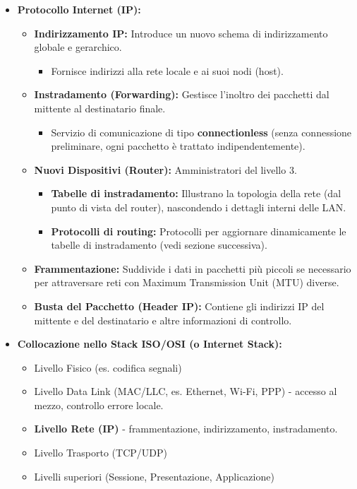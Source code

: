 \begin{itemize}
    \item \textbf{Protocollo Internet (IP):}
    \begin{itemize}
        \item \textbf{Indirizzamento IP:} Introduce un nuovo schema di indirizzamento globale e gerarchico.
        \begin{itemize}
            \item Fornisce indirizzi alla rete locale e ai suoi nodi (host).
        \end{itemize}
        \item \textbf{Instradamento (Forwarding):} Gestisce l'inoltro dei pacchetti dal mittente al destinatario finale.
        \begin{itemize}
            \item Servizio di comunicazione di tipo \textbf{connectionless} (senza connessione preliminare, ogni pacchetto è trattato indipendentemente).
        \end{itemize}
        \item \textbf{Nuovi Dispositivi (Router):} Amministratori del livello 3.
        \begin{itemize}
            \item \textbf{Tabelle di instradamento:} Illustrano la topologia della rete (dal punto di vista del router), nascondendo i dettagli interni delle LAN.
            \item \textbf{Protocolli di routing:} Protocolli per aggiornare dinamicamente le tabelle di instradamento (vedi sezione successiva).
        \end{itemize}
        \item \textbf{Frammentazione:} Suddivide i dati in pacchetti più piccoli se necessario per attraversare reti con Maximum Transmission Unit (MTU) diverse.
        \item \textbf{Busta del Pacchetto (Header IP):} Contiene gli indirizzi IP del mittente e del destinatario e altre informazioni di controllo.
    \end{itemize}
    \item \textbf{Collocazione nello Stack ISO/OSI (o Internet Stack):}
    \begin{itemize}
        \item Livello Fisico (es. codifica segnali)
        \item Livello Data Link (MAC/LLC, es. Ethernet, Wi-Fi, PPP) - accesso al mezzo, controllo errore locale.
        \item \textbf{Livello Rete (IP)} - frammentazione, indirizzamento, instradamento.
        \item Livello Trasporto (TCP/UDP)
        \item Livelli superiori (Sessione, Presentazione, Applicazione)
    \end{itemize}
\end{itemize}

